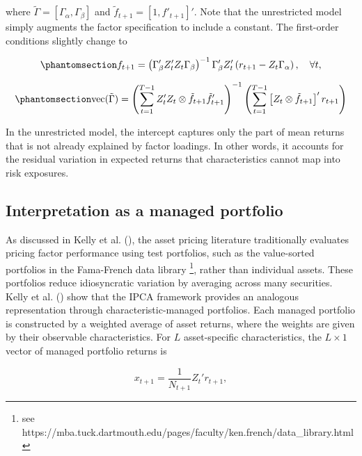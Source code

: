 \documentclass[
  12pt,
  a4paper,
  openany]{scrbook}
\begin{document}
where \(\tilde\Gamma = [\Gamma_\alpha, \Gamma_\beta]\) and
\(\tilde{f}_{t+1} = [1, f'_{t+1}]'\). Note that the unrestricted model
simply augments the factor specification to include a constant. The
first-order conditions slightly change to

\begin{equation}\phantomsection\label{eq-condition3}{
f_{t+1} = \left(\Gamma_\beta^{\prime} Z_t^{\prime} Z_t \Gamma_\beta \right)^{-1} \Gamma_\beta^{\prime} Z_t^{\prime} \left(r_{t+1} - Z_t \Gamma_\alpha \right), \quad \forall t, 
}\end{equation}

\begin{equation}\phantomsection\label{eq-condition4}{
\operatorname{vec}(\tilde{\Gamma}) =
\left(
\sum_{t=1}^{T-1} Z_t^{\prime} Z_t \otimes \tilde{f}_{t+1} \tilde{f}_{t+1}^{\prime}
\right)^{-1}
\left(
\sum_{t=1}^{T-1} \left[ Z_t \otimes \tilde{f}_{t+1} \right]^{\prime} r_{t+1}
\right)
}\end{equation}

In the unrestricted model, the intercept captures only the part of mean
returns that is not already explained by factor loadings. In other
words, it accounts for the residual variation in expected returns that
characteristics cannot map into risk exposures.

\subsection{Interpretation as a managed
portfolio}\label{interpretation-as-a-managed-portfolio}

As discussed in Kelly et al.
(), the asset pricing
literature traditionally evaluates pricing factor performance using test
portfolios, such as the value-sorted portfolios in the Fama-French data
library \footnote{see
  https://mba.tuck.dartmouth.edu/pages/faculty/ken.french/data\_library.html},
rather than individual assets. These portfolios reduce idiosyncratic
variation by averaging across many securities. Kelly et al.
() show that the IPCA
framework provides an analogous representation through
characteristic-managed portfolios. Each managed portfolio is constructed
by a weighted average of asset returns, where the weights are given by
their observable characteristics. For \(L\) asset-specific
characteristics, the \(L \times 1\) vector of managed portfolio returns
is

\[
x_{t+1} = \frac{1}{N_{t+1}} Z_t'r_{t+1},
\]
\end{document}
